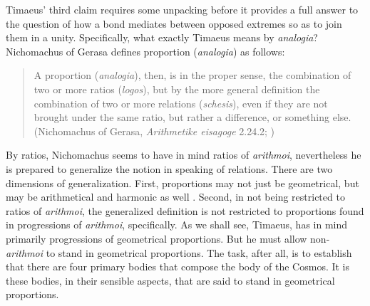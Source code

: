 Timaeus' third claim requires some unpacking before it provides a full answer to the question of how a bond mediates between opposed extremes so as to join them in a unity. Specifically, what exactly Timaeus means by \emph{analogia}? Nichomachus of Gerasa defines proportion (\emph{analogia}) as follows:
\begin{quote}
	A proportion (\emph{analogia}), then, is in the proper sense, the combination of two or more ratios (\emph{logos}), but by the more general definition the combination of two or more relations (\emph{schesis}), even if they are not brought under the same ratio, but rather a difference, or something else. (Nichomachus of Gerasa, \emph{Arithmetike eisagoge} 2.24.2; \citealt[264--5]{Dooge:1926aa})
\end{quote}
By ratios, Nichomachus seems to have in mind ratios of \emph{arithmoi}, nevertheless he is prepared to generalize the notion in speaking of relations. There are two dimensions of generalization. First, proportions may not just be geometrical, but may be arithmetical and harmonic as well \citep[264 n2]{Dooge:1926aa}. Second, in not being restricted to ratios of \emph{arithmoi}, the generalized definition is not restricted to proportions found in progressions of \emph{arithmoi}, specifically. As we shall see, Timaeus, has in mind primarily progressions of geometrical proportions. But he must allow non-\emph{arithmoi} to stand in geometrical proportions. The task, after all, is to establish that there are four primary bodies that compose the body of the Cosmos. It is these bodies, in their sensible aspects, that are said to stand in geometrical proportions.


